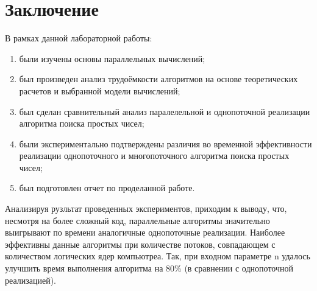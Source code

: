 \chapter*{Заключение}

В рамках данной лабораторной работы:
\begin{enumerate}
	\item были изучены основы параллельных вычислений;
	\item был произведен анализ трудоёмкости алгоритмов на основе теоретических расчетов и выбранной модели вычислений;
	\item был сделан сравнительный анализ паралелельной и однопоточной реализации алгоритма поиска простых чисел;
	\item были экспериментально подтверждены различия во временной эффективности реализации однопоточного и многопоточного алгоритма поиска простых чисел;
    \item был подготовлен отчет по проделанной работе.
\end{enumerate}

Анализируя рузльтат проведенных экспериментов, приходим к выводу, что, несмотря на более сложный код, параллельные алгоритмы значительно выигрывают по времени аналогичные однопоточные реализации. Наиболее эффективны данные алгоритмы при количестве потоков, совпадающем с количеством логических ядер компьютреа. Так, при входном параметре n удалось улучшить время выполнения алгоритма на 80\% (в сравнении с однопоточной реализацией).